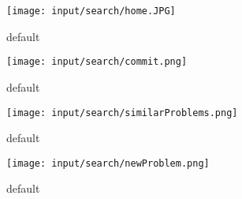 \begin{frame}
\begin{figure}[htbp]
\begin{center}
\texttt{[image: input/search/home.JPG]}
\caption{default}
\label{default}
\end{center}
\end{figure}

\end{frame}

\begin{frame}

\begin{figure}[htbp]
\begin{center}
\texttt{[image: input/search/commit.png]}
\caption{default}
\label{default}
\end{center}
\end{figure}

\end{frame}

\begin{frame}

\begin{figure}[htbp]
\begin{center}
\texttt{[image: input/search/similarProblems.png]}
\caption{default}
\label{default}
\end{center}
\end{figure}

\end{frame}

\begin{frame}

\begin{figure}[htbp]
\begin{center}
\texttt{[image: input/search/newProblem.png]}
\caption{default}
\label{default}
\end{center}
\end{figure}

\end{frame}

